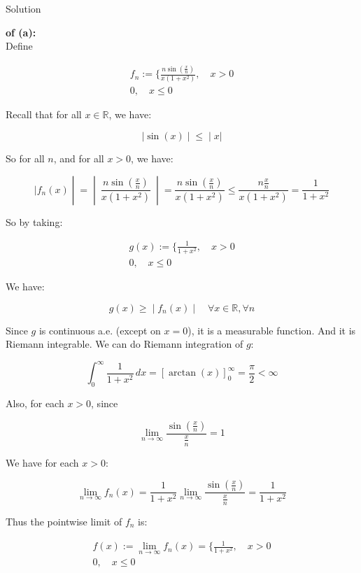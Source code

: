 \documentclass{qlnotes-export}
\begin{document}
\begin{qlsolution}{Solution}

\textbf{of (a):}\\
Define

\[\begin{matrix}
{f_{n} := \{\frac{n\sin\left( \frac{x}{n} \right)}{x(1 + x^{2})},\quad x > 0} \\
{0,\quad x \leq 0}
\end{matrix}\]

Recall that for all \(x \in {\mathbb{R}}\), we have:

\[\left. |\sin(x) \middle| \leq \middle| x| \right.\]

So for all \(n\), and for all \(x > 0\), we have:

\[\left. |f_{n}(x) \middle| = \middle| \ \frac{n\sin\left( \frac{x}{n} \right)}{x(1 + x^{2})}\  \middle| = \frac{n\sin\left( \frac{x}{n} \right)}{x(1 + x^{2})} \leq \frac{n\frac{x}{n}}{x(1 + x^{2})} = \frac{1}{1 + x^{2}} \right.\]

So by taking:

\[\begin{matrix}
{g(x) := \{\frac{1}{1 + x^{2}},\quad x > 0} \\
{0,\quad x \leq 0}
\end{matrix}\]

We have:

\[\left. g(x) \geq \middle| f_{n}(x) \middle| \quad\forall x \in {\mathbb{R}},\forall n \right.\]

Since \(g\) is continuous a.e. (except on \(x = 0\)), it is a measurable function. And it is Riemann integrable. We can do Riemann integration of \(g\):

\[\int_{0}^{\infty}\frac{1}{1 + x^{2}}\, dx = \left\lbrack {\arctan(x)} \right\rbrack_{0}^{\infty} = \frac{\pi}{2} < \infty\]

Also, for each \(x > 0\), since

\[\lim\limits_{n\rightarrow\infty}\frac{\sin(\frac{x}{n})}{\frac{x}{n}} = 1\]

We have for each \(x > 0\):

\[\lim\limits_{n\rightarrow\infty}f_{n}(x) = \frac{1}{1 + x^{2}}\lim\limits_{n\rightarrow\infty}\frac{\sin(\frac{x}{n})}{\frac{x}{n}} = \frac{1}{1 + x^{2}}\]

Thus the pointwise limit of \(f_{n}\) is:

\[\begin{matrix}
{f(x) := \lim\limits_{n\rightarrow\infty}f_{n}(x) = \{\frac{1}{1 + x^{2}},\quad x > 0} \\
{0,\quad x \leq 0}
\end{matrix}\]


\end{qlsolution}
\end{document}
